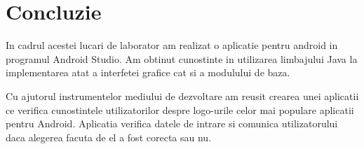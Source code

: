 \section*{Concluzie}



	In cadrul acestei lucari de laborator am realizat o aplicatie pentru android in programul Android Studio. Am obtinut cunostinte in utilizarea limbajului Java la implementarea atat a interfetei grafice cat si a modulului de baza.

	Cu ajutorul instrumentelor mediului de dezvoltare am reusit crearea unei aplicatii ce verifica cunostintele utilizatorilor despre logo-urile celor mai populare aplicatii pentru Android. Aplicatia verifica datele de intrare si comunica utilizatorului daca alegerea facuta de el a fost corecta sau nu.
	
\clearpage